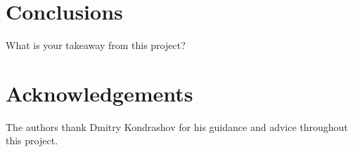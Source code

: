 \documentclass[twoside,twocolumn,9pt]{article}
\begin{document}
\section{Conclusions}
What is your takeaway from this project?


\section{Acknowledgements}

The authors thank Dmitry Kondrashov for his guidance and advice throughout this project.






\end{document}
